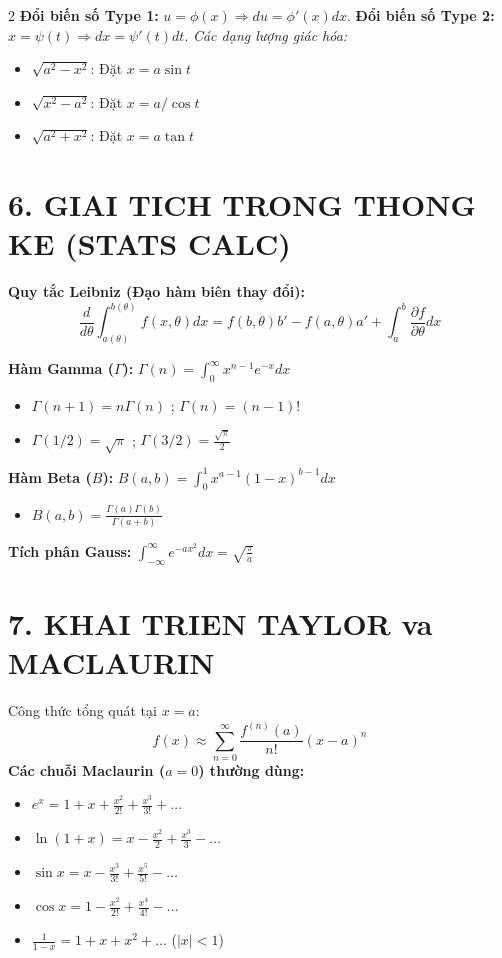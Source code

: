 \documentclass[8pt,a4paper]{article}
\begin{document}
\begin{multicols*}{2}
\textbf{Đổi biến số Type 1:} $u = \phi(x) \Rightarrow du = \phi'(x)dx$.
\textbf{Đổi biến số Type 2:} $x = \psi(t) \Rightarrow dx = \psi'(t)dt$.
\textit{Các dạng lượng giác hóa:}
\begin{itemize}
    \item $\sqrt{a^2-x^2}$: Đặt $x = a\sin t$
    \item $\sqrt{x^2-a^2}$: Đặt $x = a/\cos t$
    \item $\sqrt{a^2+x^2}$: Đặt $x = a\tan t$
\end{itemize}

\section{6. GIAI TICH TRONG THONG KE (STATS CALC)}
\textbf{Quy tắc Leibniz (Đạo hàm biên thay đổi):}
$$\frac{d}{d\theta} \int_{a(\theta)}^{b(\theta)} f(x, \theta) dx = f(b, \theta)b' - f(a, \theta)a' + \int_{a}^{b} \frac{\partial f}{\partial \theta} dx$$

\textbf{Hàm Gamma ($\Gamma$):} $\Gamma(n) = \int_0^\infty x^{n-1}e^{-x} dx$
\begin{itemize}
    \item $\Gamma(n+1) = n\Gamma(n)$ ; $\Gamma(n) = (n-1)!$
    \item $\Gamma(1/2) = \sqrt{\pi}$ ; $\Gamma(3/2) = \frac{\sqrt{\pi}}{2}$
\end{itemize}

\textbf{Hàm Beta ($B$):} $B(a, b) = \int_0^1 x^{a-1}(1-x)^{b-1} dx$
\begin{itemize}
    \item $B(a, b) = \frac{\Gamma(a)\Gamma(b)}{\Gamma(a+b)}$
\end{itemize}

\textbf{Tích phân Gauss:} $\int_{-\infty}^{\infty} e^{-ax^2} dx = \sqrt{\frac{\pi}{a}}$

\section{7. KHAI TRIEN TAYLOR va MACLAURIN}
Công thức tổng quát tại $x=a$:
$$f(x) \approx \sum_{n=0}^\infty \frac{f^{(n)}(a)}{n!}(x-a)^n$$
\textbf{Các chuỗi Maclaurin ($a=0$) thường dùng:}
\begin{itemize}
    \item $e^x = 1 + x + \frac{x^2}{2!} + \frac{x^3}{3!} + \dots$
    \item $\ln(1+x) = x - \frac{x^2}{2} + \frac{x^3}{3} - \dots$
    \item $\sin x = x - \frac{x^3}{3!} + \frac{x^5}{5!} - \dots$
    \item $\cos x = 1 - \frac{x^2}{2!} + \frac{x^4}{4!} - \dots$
    \item $\frac{1}{1-x} = 1 + x + x^2 + \dots$ ($|x| < 1$)
\end{itemize}


\end{multicols*}
\end{document}
